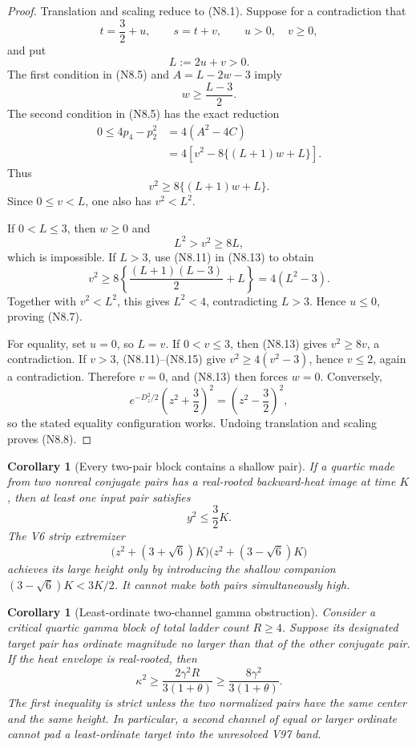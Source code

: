 \documentclass[11pt]{article}
\newtheorem{corollary}[theorem]{Corollary}
\theoremstyle{definition}
\theoremstyle{remark}
\begin{document}
\begin{proof}
Translation and scaling reduce to \textup{(N8.1)}.  Suppose for a
contradiction that
\[
 t=\frac32+u,\qquad
 s=t+v,\qquad
 u>0,\quad v\ge0,
 \tag{N8.9}
\]
and put
\[
 L:=2u+v>0.
 \tag{N8.10}
\]
The first condition in \textup{(N8.5)} and
\(A=L-2w-3\) imply
\[
 w\ge\frac{L-3}{2}.
 \tag{N8.11}
\]
The second condition in \textup{(N8.5)} has the exact reduction
\[
\begin{aligned}
 0\le4p_4-p_2^2
 &=4(A^2-4C)\\
 &=4\left[
 v^2-8\{(L+1)w+L\}
 \right].
\end{aligned}
\tag{N8.12}
\]
Thus
\[
 v^2\ge8\{(L+1)w+L\}.
 \tag{N8.13}
\]
Since \(0\le v<L\), one also has \(v^2<L^2\).

If \(0<L\le3\), then \(w\ge0\) and
\[
 L^2>v^2\ge8L,
 \tag{N8.14}
\]
which is impossible.  If \(L>3\), use \textup{(N8.11)} in
\textup{(N8.13)} to obtain
\[
 v^2\ge
 8\left\{\frac{(L+1)(L-3)}2+L\right\}
 =4(L^2-3).
 \tag{N8.15}
\]
Together with \(v^2<L^2\), this gives \(L^2<4\), contradicting \(L>3\).
Hence \(u\le0\), proving \textup{(N8.7)}.

For equality, set \(u=0\), so \(L=v\).  If \(0<v\le3\), then
\textup{(N8.13)} gives \(v^2\ge8v\), a contradiction.  If \(v>3\),
\textup{(N8.11)}--\textup{(N8.15)} give \(v^2\ge4(v^2-3)\), hence
\(v\le2\), again a contradiction.  Therefore \(v=0\), and
\textup{(N8.13)} then forces \(w=0\).  Conversely,
\[
 e^{-D_z^2/2}\left(z^2+\frac32\right)^2
 =\left(z^2-\frac32\right)^2,
 \tag{N8.16}
\]
so the stated equality configuration works.  Undoing translation and
scaling proves \textup{(N8.8)}.
\end{proof}

\begin{corollary}[Every two-pair block contains a shallow pair]
\label{cor:f2v8-shallow}
If a quartic made from two nonreal conjugate pairs has a real-rooted
backward-heat image at time \(K\), then at least one input pair satisfies
\[
 y^2\le\frac32K.
 \tag{N8.17}
\]
The V6 strip extremizer
\[
 \bigl(z^2+(3+\sqrt6)K\bigr)
 \bigl(z^2+(3-\sqrt6)K\bigr)
 \tag{N8.18}
\]
achieves its large height only by introducing the shallow companion
\((3-\sqrt6)K<3K/2\).  It cannot make both pairs simultaneously high.
\end{corollary}

\begin{corollary}[Least-ordinate two-channel gamma obstruction]
\label{cor:f2v8-gamma}
Consider a critical quartic gamma block of total ladder count \(R\ge4\).
Suppose its designated target pair has ordinate magnitude no larger than
that of the other conjugate pair.  If the heat envelope is real-rooted, then
\[
 \boxed{
 \kappa^2\ge
 \frac{2\gamma^2R}{3(1+\theta)}
 \ge
 \frac{8\gamma^2}{3(1+\theta)}.}
 \tag{N8.19}
\]
The first inequality is strict unless the two normalized pairs have the
same center and the same height.  In particular, a second channel of equal
or larger ordinate cannot pad a least-ordinate target into the unresolved
V97 band.
\end{corollary}
\end{document}
